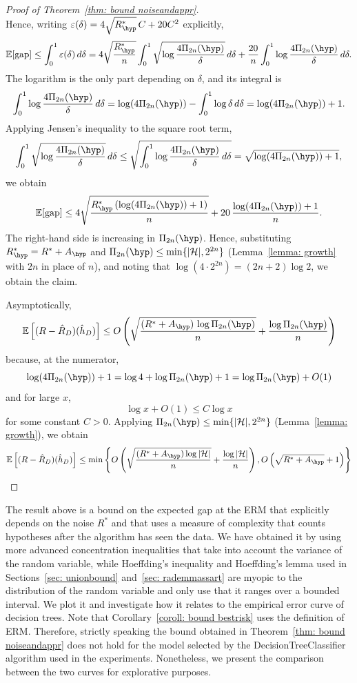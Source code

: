 \documentclass[reqno]{amsart}
\begin{document}
\begin{theorem}
\begin{proof}[Proof of Theorem~\ref{thm: bound noiseandappr}]
\[\]
Hence, writing $\varepsilon(\delta) = 4\sqrt{R^*_\hyp}\,C + 20C^2$ explicitly,
\[
\expv[\text{gap}] \le \int_0^1 \varepsilon(\delta)\,d\delta = 4\sqrt{\frac{R^*_\hyp}{n}}\int_0^1 \sqrt{\log\frac{4\Pi_{2n}(\hyp)}{\delta}}\,d\delta + \frac{20}{n}\int_0^1 \log\frac{4\Pi_{2n}(\hyp)}{\delta}\,d\delta.
\]
The logarithm is the only part depending on $\delta$, and its integral is
\[
\int_0^1 \log\frac{4\Pi_{2n}(\hyp)}{\delta}\,d\delta = \log(4\Pi_{2n}(\hyp)) - \int_0^1 \log\delta\,d\delta = \log(4\Pi_{2n}(\hyp)) + 1.
\]
Applying Jensen's inequality to the square root term,
\[
\int_0^1 \sqrt{\log\frac{4\Pi_{2n}(\hyp)}{\delta}}\,d\delta \le \sqrt{\int_0^1 \log\frac{4\Pi_{2n}(\hyp)}{\delta}\,d\delta} = \sqrt{\log(4\Pi_{2n}(\hyp)) + 1},
\]
we obtain
\[
\expv[\text{gap}] \le 4\sqrt{\frac{R^*_\hyp\left(\log(4\Pi_{2n}(\hyp)) + 1\right)}{n}} + 20\,\frac{\log(4\Pi_{2n}(\hyp)) + 1}{n}.
\]
The right-hand side is increasing in $\Pi_{2n}(\hyp)$. Hence, substituting $R^*_\hyp = R^*+A_\hyp$ and $\Pi_{2n}(\hyp)\le\min\{\card,2^{2n}\}$ (Lemma~\ref{lemma: growth} with $2n$ in place of $n$), and noting that $\log(4\cdot 2^{2n}) = (2n+2)\log 2$, we obtain the claim.

Asymptotically,
\[
\expv\left[(R-\hat R_D)(\hat h_D)\right] \le O\left(
\sqrt{\frac{(R^*+A_{\hyp})\,\log \Pi_{2n}(\hyp)}{n}} + \frac{\log \Pi_{2n}(\hyp)}{n} \right)
\]
because, at the numerator,
\[
\log (4 \Pi_{2n}(\hyp)) + 1 = \log 4 + \log \Pi_{2n}(\hyp) + 1 = \log \Pi_{2n}(\hyp) + O(1)
\]
and for large $x$, 
\[
\log x + O(1) \le C \log x
\] 
for some constant $C>0$.
Applying $\Pi_{2n}(\hyp)\le\min\{\card,2^{2n}\}$ (Lemma~\ref{lemma: growth}), we obtain
\[
\expv\left[(R-\hat R_D)(\hat h_D)\right] \le \min\left\{ O\left(
\sqrt{\frac{(R^*+A_{\hyp})\log \card}{n}} + \frac{\log\card}{n} \right), O\left(\sqrt{R^*+A_{\hyp}}+1 \right)\right\}
\]
\end{proof}
\end{theorem}

The result above is a bound on the expected gap at the ERM that explicitly depends on the noise $R^*$ and that uses a measure of complexity that counts hypotheses after the algorithm has seen the data. 
We have obtained it by using more advanced concentration inequalities that take into account the variance of the random variable, while Hoeffding's inequality and Hoeffding's lemma used in Sections~\ref{sec: unionbound} and~\ref{sec: rademmassart} are myopic to the distribution of the random variable and only use that it ranges over a bounded interval. 
We plot it and investigate how it relates to the empirical error curve of decision trees. Note that Corollary~\ref{coroll: bound bestrisk} uses the definition of ERM. Therefore, strictly speaking the bound obtained in Theorem~\ref{thm: bound noiseandappr} does not hold for the model selected by the DecisionTreeClassifier algorithm used in the experiments. Nonetheless, we present the comparison between the two curves for explorative purposes.
\end{document}
